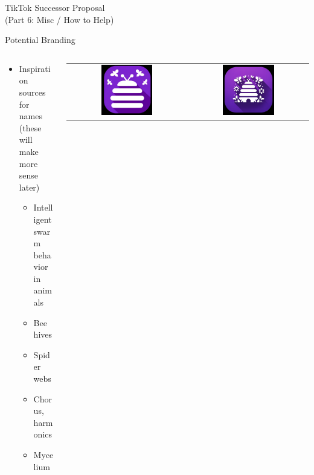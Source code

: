 \documentclass[aspectratio=169]{beamer}
\begin{document}
\begin{frame}
    \centering
    \Huge TikTok Successor Proposal \\
    \Huge (Part 6: Misc / How to Help)
\end{frame}

\begin{frame}{Potential Branding}
\begin{columns}[T]
    \begin{column}[T]{0.5\textwidth}
        \begin{itemize}
            \item Inspiration sources for names (these will make more sense later)
            \begin{itemize}
                \item Intelligent swarm behavior in animals
                \item Bee hives
                \item Spider webs
                \item Chorus, harmonics
                \item Mycelium
            \end{itemize}
        \end{itemize}
    \end{column}
    \begin{column}{0.5\textwidth}
        \begin{tabular}{cc}
            \includegraphics[width=0.45\textwidth]{imgs/app_icons/1.png} & \includegraphics[width=0.45\textwidth]{imgs/app_icons/2.png} \\ 

\end{tabular}
\end{column}
\end{columns}
\end{frame}
\end{document}
